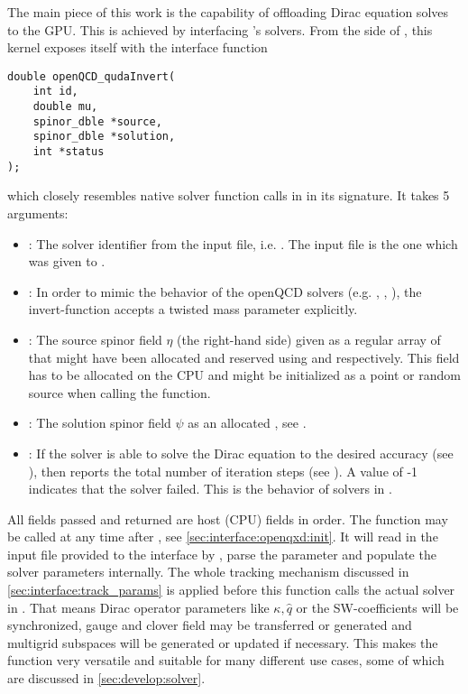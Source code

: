 The main piece of this work is the capability of offloading Dirac equation solves to the GPU.
This is achieved by interfacing \quda's solvers.
From the side of \openqxd, this kernel exposes itself with the interface function
\begin{verbatim}
double openQCD_qudaInvert(
    int id,
    double mu,
    spinor_dble *source,
    spinor_dble *solution,
    int *status
);
\end{verbatim}
which closely resembles native solver function calls in \openqxd in its signature.
It takes \num{5} arguments:
\begin{itemize}
  \item {}: The solver identifier from the input file, i.e. . The input file is the one which was given to .
  \item {}: In order to mimic the behavior of the openQCD solvers (e.g. , , ), the invert-function accepts a twisted mass parameter  explicitly.
  \item {}: The source spinor field $\eta$ (the right-hand side) given as a regular \openqxd array of  that might have been allocated and reserved using  and  respectively. This field has to be allocated on the CPU and might be initialized as a point or random source when calling the function.
  \item {}: The solution spinor field $\psi$ as an allocated , see .
  \item {}: If the solver is able to solve the Dirac equation to the desired accuracy (see ), then  reports the total number of iteration steps (see ). A value of -1 indicates that the solver failed. This is the behavior of solvers in \openqxd.
\end{itemize}

All fields passed and returned are host (CPU) fields in \openqxd order.
The function may be called at any time after , see \cref{sec:interface:openqxd:init}.
It will read in the input file provided to the interface by , parse the parameter and populate the solver parameters internally.
The whole tracking mechanism discussed in \cref{sec:interface:track_params} is applied before this function calls the actual solver in \quda.
That means Dirac operator parameters like $\kappa, \hat{q}$ or the SW-coefficients will be synchronized, gauge and clover field may be transferred or generated and multigrid subspaces will be generated or updated if necessary.
This makes the function very versatile and suitable for many different use cases, some of which are discussed in \cref{sec:develop:solver}.

